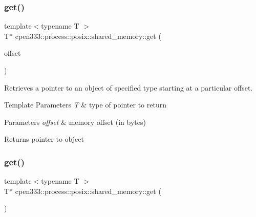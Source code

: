 \subsubsection{\texorpdfstring{get()}{get()}\hspace{0.1cm}{\footnotesize\ttfamily [2/3]}}
{\footnotesize\ttfamily template$<$typename T $>$ \\
T$\ast$ cpen333\+::process\+::posix\+::shared\+\_\+memory\+::get (\begin{DoxyParamCaption}\item[{size\+\_\+t}]{offset }\end{DoxyParamCaption})\hspace{0.3cm}{\ttfamily [inline]}}



Retrieves a pointer to an object of specified type starting at a particular offset. 


\begin{DoxyTemplParams}{Template Parameters}
{\em T} & type of pointer to return \\
\hline
\end{DoxyTemplParams}

\begin{DoxyParams}{Parameters}
{\em offset} & memory offset (in bytes) \\
\hline
\end{DoxyParams}
\begin{DoxyReturn}{Returns}
pointer to object 
\end{DoxyReturn}
\mbox{\label{classcpen333_1_1process_1_1posix_1_1shared__memory_a705beedc2e0b3bde2e044fe742f641ea}} 
\subsubsection{\texorpdfstring{get()}{get()}\hspace{0.1cm}{\footnotesize\ttfamily [3/3]}}
{\footnotesize\ttfamily template$<$typename T $>$ \\
T$\ast$ cpen333\+::process\+::posix\+::shared\+\_\+memory\+::get (\begin{DoxyParamCaption}{ }\end{DoxyParamCaption})\hspace{0.3cm}{\ttfamily [inline]}}



